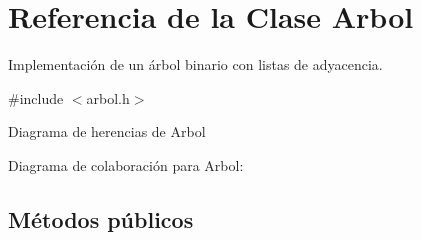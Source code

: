 \hypertarget{classArbol}{}\section{Referencia de la Clase Arbol}
\label{classArbol}


Implementación de un árbol binario con listas de adyacencia. ~\newline
  




{\ttfamily \#include $<$arbol.\+h$>$}



Diagrama de herencias de Arbol


Diagrama de colaboración para Arbol\+:
\subsection*{Métodos públicos}
